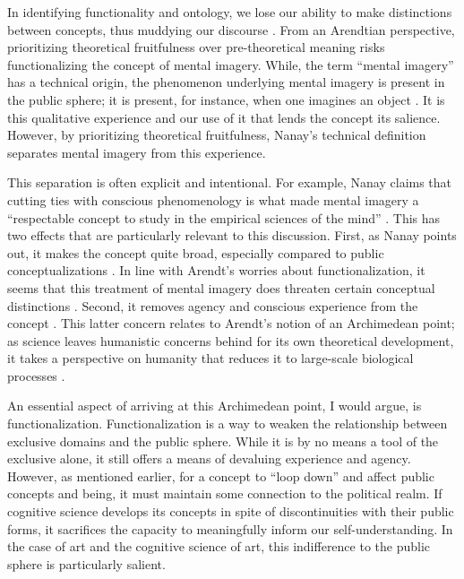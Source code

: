 \documentclass[12pt,letterpaper]{article}
\begin{document}
In identifying functionality and ontology, we lose our ability to make
distinctions between concepts, thus muddying our discourse
\autocite[101-102]{arendtFuture1968}. From an Arendtian perspective,
prioritizing theoretical fruitfulness over pre-theoretical meaning risks
functionalizing the concept of mental imagery. While, the term ``mental
imagery'' has a technical origin, the phenomenon underlying mental imagery is
present in the public sphere; it is present, for instance, when one imagines an
object \autocite[3]{nanayMental2023}. It is this qualitative experience and our
use of it that lends the concept its salience. However, by prioritizing
theoretical fruitfulness, Nanay's technical definition separates mental imagery
from this experience.

This separation is often explicit and intentional. For example, Nanay claims
that cutting ties with conscious phenomenology is what made mental imagery a
``respectable concept to study in the empirical sciences of the mind''
\autocite[13]{nanayMental2023}. This has two effects that are particularly
relevant to this discussion. First, as Nanay points out, it makes the concept
quite broad, especially compared to public conceptualizations
\autocite[251]{nanayMental2023}. In line with Arendt's worries about
functionalization, it seems that this treatment of mental imagery does threaten
certain conceptual distinctions \autocite[101--102]{arendtFuture1968}. Second,
it removes agency and conscious experience from the concept \autocite[17,
23]{nanayMental2023}. This latter concern relates to Arendt's notion of an
Archimedean point; as science leaves humanistic concerns behind for its own
theoretical development, it takes a perspective on humanity that reduces it to
large-scale biological processes \autocite[279--280]{arendtFuture1968}.

An essential aspect of arriving at this Archimedean point, I would argue, is
functionalization. Functionalization is a way to weaken the relationship between
exclusive domains and the public sphere. While it is by no means a tool of the
exclusive alone, it still offers a means of devaluing experience and agency.
However, as mentioned earlier, for a concept to ``loop down'' and affect public
concepts and being, it must maintain some connection to the political realm. If
cognitive science develops its concepts in spite of discontinuities with their
public forms, it sacrifices the capacity to meaningfully inform our
self-understanding. In the case of art and the cognitive science of art, this
indifference to the public sphere is particularly salient.
\end{document}
